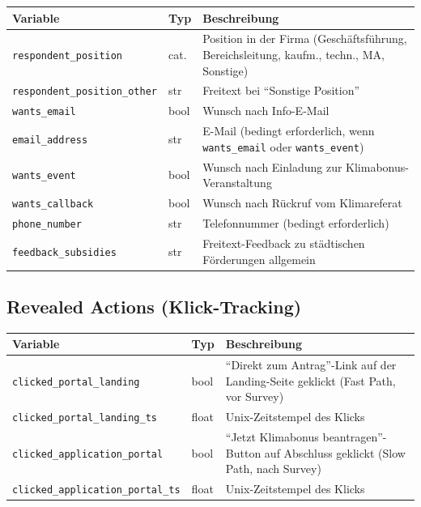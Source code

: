 \documentclass[11pt, a4paper]{scrartcl}
\newcommand{\var}[1]{\texttt{\small #1}}
\begin{document}
\begin{longtable}{@{}p{3.6cm} p{2.0cm} p{9.5cm}@{}}
\toprule
\textbf{Variable} & \textbf{Typ} & \textbf{Beschreibung} \\
\midrule
\endhead
\var{respondent\_position}        & cat. & Position in der Firma (Geschäftsführung, Bereichsleitung, kaufm., techn., MA, Sonstige) \\
\var{respondent\_position\_other} & str  & Freitext bei \enquote{Sonstige Position} \\
\var{wants\_email}                & bool & Wunsch nach Info-E-Mail \\
\var{email\_address}              & str  & E-Mail (bedingt erforderlich, wenn \var{wants\_email} oder \var{wants\_event}) \\
\var{wants\_event}                & bool & Wunsch nach Einladung zur Klimabonus-Veranstaltung \\
\var{wants\_callback}             & bool & Wunsch nach Rückruf vom Klimareferat \\
\var{phone\_number}               & str  & Telefonnummer (bedingt erforderlich) \\
\var{feedback\_subsidies}         & str  & Freitext-Feedback zu städtischen Förderungen allgemein \\
\bottomrule
\end{longtable}

\subsection{Revealed Actions (Klick-Tracking)}

\begin{longtable}{@{}p{3.8cm} p{2.0cm} p{9.3cm}@{}}
\toprule
\textbf{Variable} & \textbf{Typ} & \textbf{Beschreibung} \\
\midrule
\endhead
\var{clicked\_portal\_landing}        & bool  & \enquote{Direkt zum Antrag}-Link auf der Landing-Seite geklickt (Fast Path, vor Survey) \\
\var{clicked\_portal\_landing\_ts}    & float & Unix-Zeitstempel des Klicks \\
\var{clicked\_application\_portal}    & bool  & \enquote{Jetzt Klimabonus beantragen}-Button auf Abschluss geklickt (Slow Path, nach Survey) \\
\var{clicked\_application\_portal\_ts}& float & Unix-Zeitstempel des Klicks \\
\bottomrule
\end{longtable}
\end{document}
